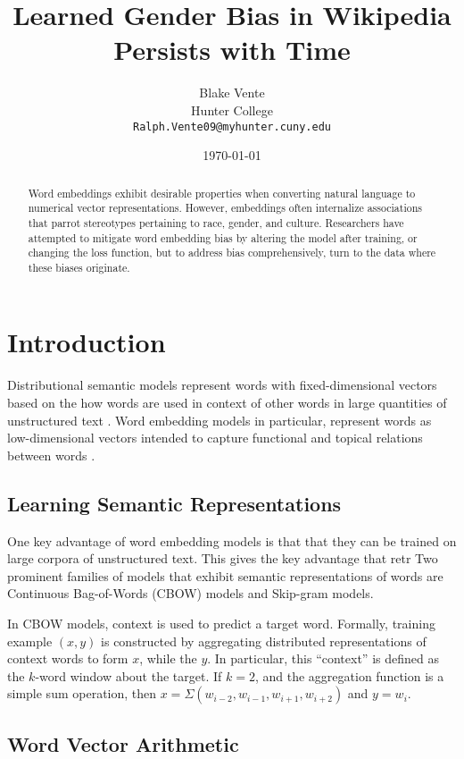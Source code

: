\documentclass[11pt,a4paper]{article}
\title{Learned Gender Bias in Wikipedia Persists with Time}
\author{Blake Vente \\
  Hunter College\\
  \texttt{Ralph.Vente09@myhunter.cuny.edu}}
\date{\today{}}
\begin{document}
\maketitle
\begin{abstract}
Word embeddings exhibit desirable properties when converting natural language to
numerical vector representations. However, embeddings often internalize
associations that parrot stereotypes pertaining to  race, gender, and culture.
Researchers have attempted to mitigate word embedding bias by altering the model
after training, or changing the loss function, but to address bias
comprehensively, \citet{origins-1810-03611} turn to the data where these biases
originate.
\end{abstract}

\section{Introduction}

Distributional semantic models represent words with fixed-dimensional vectors
based on the how words are used in context of other words in large quantities of
unstructured text \cite{lison2017redefining}. Word embedding models in
particular, represent words as low-dimensional vectors intended to capture
functional and topical relations between words \cite{lison2017redefining}.

\subsection{Learning Semantic Representations}

One key advantage of word embedding models is that that they can be trained on
large corpora of unstructured text. This gives the key advantage that retr Two prominent families of models  that
exhibit semantic representations of words are Continuous Bag-of-Words (CBOW)
models and Skip-gram models.

In CBOW models, context is used to predict a target word. Formally, training
example $(x,y)$ is constructed by aggregating distributed representations of
context words to form $x$, while the $y$. In particular, this ``context'' is
defined as the $k$-word window about the target. If $k=2$, and the aggregation
function is a simple sum operation, then $x = \Sigma (w_{i-2}, w_{i-1},
w_{i+1}, w_{i+2})$ and $y=w_i$.



\subsection{Word Vector Arithmetic}
\end{document}
